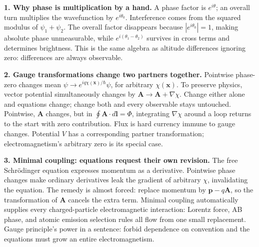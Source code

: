 \begin{mathbridge}
\textbf{1. Why phase is multiplication by a hand.} A phase factor is \(e^{i\theta}\); an overall turn multiplies the wavefunction by \(e^{i\theta_0}\). Interference comes from the squared modulus of \(\psi_1+\psi_2\). The overall factor disappears because \(|e^{i\theta_0}|=1\), making absolute phase unmeasurable, while \(e^{i(\theta_1-\theta_2)}\) survives in cross terms and determines brightness. This is the same algebra as altitude differences ignoring zero: differences are always observable.

\textbf{2. Gauge transformations change two partners together.} Pointwise phase-zero changes mean \(\psi\to e^{iq\chi(\mathbf x)/\hbar}\psi\), for arbitrary \(\chi(\mathbf x)\). To preserve physics, vector potential simultaneously changes by \(\mathbf A\to\mathbf A+\nabla\chi\). Change either alone and equations change; change both and every observable stays untouched. Pointwise, \(\mathbf A\) changes, but in \(\oint\mathbf A\cdot d\mathbf l=\Phi\), integrating \(\nabla\chi\) around a loop returns to the start with zero contribution. Flux is hard currency immune to gauge changes. Potential \(V\) has a corresponding partner transformation; electromagnetism's arbitrary zero is its special case.

\textbf{3. Minimal coupling: equations request their own revision.} The free Schr\"odinger equation expresses momentum as a derivative. Pointwise phase changes make ordinary derivatives leak the gradient of arbitrary \(\chi\), invalidating the equation. The remedy is almost forced: replace momentum by \(\mathbf p-q\mathbf A\), so the transformation of \(\mathbf A\) cancels the extra term. Minimal coupling automatically supplies every charged-particle electromagnetic interaction: Lorentz force, AB phase, and atomic emission selection rules all flow from one small replacement. Gauge principle's power in a sentence: forbid dependence on convention and the equations must grow an entire electromagnetism.
\end{mathbridge}

